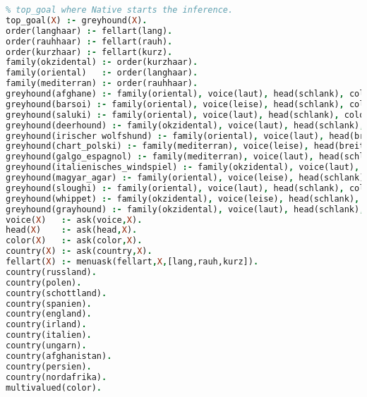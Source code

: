 \documentclass[12pt]{article}
\begin{document}
\begin{lstlisting}[language=Prolog]
% GREYHOUNDS - a sample greyhound identification system for use with the native shell.
% top_goal where Native starts the inference.
top_goal(X) :- greyhound(X).
order(langhaar) :- fellart(lang).
order(rauhhaar) :- fellart(rauh).
order(kurzhaar) :- fellart(kurz).
family(okzidental) :- order(kurzhaar).
family(oriental)   :- order(langhaar).
family(mediterran) :- order(rauhhaar).
greyhound(afghane) :- family(oriental), voice(laut), head(schlank), color(hellbraun), country(afghanistan).
greyhound(barsoi) :- family(oriental), voice(leise), head(schlank), color(hellbraun), country(russland).
greyhound(saluki) :- family(oriental), voice(laut), head(schlank), color(hellbraun), country(persien).
greyhound(deerhound) :- family(okzidental), voice(laut), head(schlank), color(braun), country(schottland).
greyhound(irischer wolfshund) :- family(oriental), voice(laut), head(breit), color(grau), country(irland).
greyhound(chart_polski) :- family(mediterran), voice(leise), head(breit), color(hellbraun), country(polen).
greyhound(galgo_espagnol) :- family(mediterran), voice(laut), head(schlank), color(gescheckt), country(spanien).
greyhound(italienisches_windspiel) :- family(okzidental), voice(laut), head(schlank), color(gescheckt), country(italien).
greyhound(magyar_agar) :- family(oriental), voice(leise), head(schlank), color(hellbraun), country(ungarn).
greyhound(sloughi) :- family(oriental), voice(laut), head(schlank), color(hellbraun), country(nordafrika).
greyhound(whippet) :- family(okzidental), voice(leise), head(schlank), (color(gescheckt); color(hellbraun); color(weis)), country(england).
greyhound(grayhound) :- family(okzidental), voice(laut), head(schlank), color(gescheckt), country(england).
voice(X)   :- ask(voice,X).
head(X)    :- ask(head,X).
color(X)   :- ask(color,X).
country(X) :- ask(country,X).
fellart(X) :- menuask(fellart,X,[lang,rauh,kurz]).
country(russland).
country(polen).
country(schottland).
country(spanien).
country(england).
country(irland).
country(italien).
country(ungarn).
country(afghanistan).
country(persien).
country(nordafrika).
multivalued(color).
\end{lstlisting}
\end{document}
